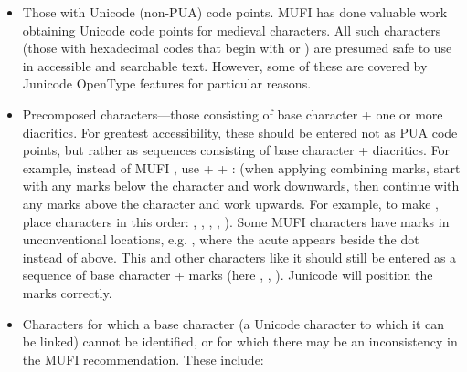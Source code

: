 \liststyleLi
\begin{itemize}
\item Those with Unicode (non-PUA) code points. MUFI has done valuable work obtaining Unicode code points for medieval characters.
All such characters (those with hexadecimal codes that  begin with 
or ) are presumed safe to use in accessible and searchable text. However, some of these are
covered by Junicode OpenType features for particular reasons.
\item Precomposed characters---those consisting of base character + one or more diacritics. For greatest accessibility,
these should be entered not as PUA code points, but rather as sequences consisting of base character +
diacritics. For example, instead of MUFI  , use
 +   +  :
 (when applying combining marks, start with any marks below the character and work
downwards, then continue with any marks above the character and work upwards. For example, to make
, place characters in this order: ,
 ,  ,  ,  ). Some MUFI characters have marks in unconventional locations,
e.g.  , where the
acute appears beside the dot instead of above. This and other characters like it should still be entered as a sequence
of base character + marks (here ,  ,
 ). Junicode will position the marks correctly.
\item Characters for which a base character (a Unicode character to which it can be linked) cannot be identified, or for
which there may be an inconsistency in the MUFI recommendation. These include:


\end{itemize}
